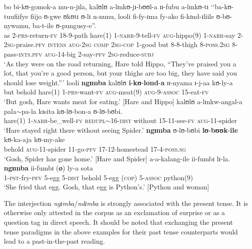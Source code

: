 \begin{exe}
\ex \label{exNarrativePresentNgimbaPRS}
\gll bo bi-kʊ-gomok-a mu-n-jɪla, kalʊlʊ a-lɪnkʊ-jɪ-bʊʊl-a ɪɪ-fubu a-lɪnkʊ-tɪ \textup{\lq\lq}ba-kʊ-tuufiifye fiijo ʊ-gwe ʊkʊtɪ ʊ-lɪ n-nunu, looli fi-fy-ɪma fy-ako fi-kɪnd-ɪliile ʊ-bʊ-nywamu, ba-t-ile ʊ-pungusy-e\textup{''}.\\
as 2-\textsc{prs}-return-\textsc{fv} 18-9-path hare(1) 1-\textsc{narr}-9-tell-\textsc{fv} \textsc{aug}-hippo(9) 1-\textsc{narr}-say \phantom{\lq\lq}2-\textsc{2sg}-praise.\textsc{pfv} \textsc{intens} \textsc{aug}-\textsc{2sg} \textsc{comp} \textsc{2sg}-\textsc{cop} 1-good but 8-8-thigh 8-\textsc{poss.2sg} 8-pass-\textsc{ints}.\textsc{pfv} \textsc{aug}-14-big 2-say-\textsc{pfv} \textsc{2sg}-reduce-\textsc{subj}\\
\glt \lq As they were on the road returning, Hare told Hippo, ``They've praised you a lot, that you're a good person, but your thighs are too big, they have said you should lose weight.''{}'
\sn \gll looli \textbf{ngɪmba} kalʊlʊ \textbf{i}-\textbf{kʊ}-\textbf{lond}-\textbf{a} ɪɪ-nyama ɪ-j-aa kʊ-ly-a\\
but behold hare(1) 1-\textsc{prs}-want-\textsc{fv} \textsc{aug}-meat(9) \textsc{aug}-9-\textsc{assoc} 15-eat-\textsc{fv}\\
\glt  \lq But gosh, Hare wants meat for eating.' [Hare and Hippo]
\ex \label{exNarrativePresentNgimbaPFV}\gll kalʊlʊ a-lɪnkw-angal-a pala$\sim$pa-la kɪsita kʊ-lʊ-bon-a ʊ-lʊ-bʊbi.\\
hare(1) 1-\textsc{narr}-be\_well-\textsc{fv}  \textsc{redupl}$\sim$16-\textsc{dist} without 15-11-see-\textsc{fv} \textsc{aug}-11-spider \\
\glt `Hare stayed right there without seeing Spider.'
\sn \gll \textbf{ngɪmba} ʊ-lʊ-bʊbi \textbf{lʊ}-\textbf{bʊʊk}-\textbf{ile} kʊ-ka-aja kʊ-my-ake\\
behold \textsc{aug}-11-spider 11-go-\textsc{pfv} 17-12-homestead 17-4-\textsc{poss.sg}\\
\glt \lq Gosh, Spider has gone home.' [Hare and Spider]
\ex \label{exNarrativePresentNgimbaCOP}\gll a-a-kalang-ile ii-fumbɪ lɪ-la. \textbf{ngɪmba} ii-fumbɪ \textup{(}\textbf{ø}\textup{)} ly-a sota\\
1-\textsc{pst}-fry-\textsc{pfv} 5-egg 5-\textsc{dist} behold 5-egg (\textsc{cop}) 5-\textsc{assoc} python(9)\\
\glt \lq She fried that egg. Gosh, that egg is Python's.' [Python and woman]
\end{exe}

The interjection \textit{ngɪmba}/\textit{ndɪmba} is strongly associated with the present tense. It is otherwise only attested in the corpus as an exclamation of surprise or as a question tag in direct speech. It should be noted that exchanging the present tense paradigms in the above examples for their past tense counterparts would lead to a past-in-the-past reading.

